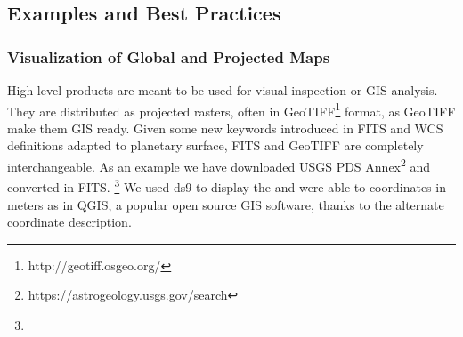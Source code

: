 \subsection{Examples and Best Practices}

\subsubsection{Visualization of Global and Projected Maps}
\label{sssec:maps}
High level products are meant to be used for visual inspection or GIS analysis.
They are distributed as projected rasters, often in
GeoTIFF\footnote{http://geotiff.osgeo.org/}
format, as GeoTIFF make them GIS ready.
Given some new keywords introduced in FITS and WCS definitions adapted to planetary
surface, FITS and GeoTIFF are completely interchangeable.
As an example we have downloaded \DIFdelbegin {}\DIFdelend \DIFaddbegin {}\DIFaddend USGS
PDS Annex\footnote{https://astrogeology.usgs.gov/search} and converted \DIFdelbegin {}\DIFdelend \DIFaddbegin {}\DIFaddend in FITS.
\DIFaddbegin {}\footnote{} \DIFaddend We used ds9 to display the \DIFdelbegin {}\DIFdelend \DIFaddbegin {}\DIFaddend and were able to \DIFdelbegin {}\DIFdelend \DIFaddbegin {}\DIFaddend coordinates in meters \DIFaddbegin {}\DIFaddend as in QGIS, a popular open source GIS software, \DIFdelbegin {}\DIFdelend thanks to the alternate coordinate
description\DIFdelbegin {}\DIFdelend .
